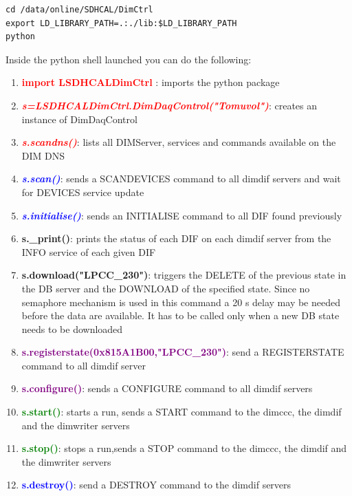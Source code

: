 \documentclass[english]{article}
\begin{document}
\begin{verbatim}
cd /data/online/SDHCAL/DimCtrl
export LD_LIBRARY_PATH=.:./lib:$LD_LIBRARY_PATH
python
\end{verbatim}  

Inside the python shell launched you can do the following:

\begin{enumerate} 
\item \textcolor{red}{ \bf  import LSDHCALDimCtrl} :  imports the python package

\item \textcolor{red}{\it \bf s=LSDHCALDimCtrl.DimDaqControl("Tomuvol")}:  creates an instance of DimDaqControl

\item \textcolor{red}{\it \bf s.scandns()}: lists all DIMServer, services and commands available on the DIM DNS  
\item \textcolor{blue}{\it \bf s.scan()}: sends a SCANDEVICES command to all dimdif servers and wait for DEVICES service update

\item \textcolor{blue}{\it {\bf s.initialise()}}: sends an INITIALISE command to all DIF found previously
\item {\bf s.\_print()}: prints the status of each DIF on each dimdif server from the INFO service of each given DIF
\item {\bf s.download("LPCC\_230")}: triggers the DELETE of the previous state in the DB server and the DOWNLOAD of the specified state. Since no semaphore mechanism is used in this command a 20 s delay may be needed before the data are available. It has to be called only when a new DB state needs to be downloaded

\item \textcolor{purple}{\bf s.registerstate(0x815A1B00,"LPCC\_230")}: send a REGISTERSTATE command to all dimdif server

\item \textcolor{purple}{\bf s.configure()}: sends a CONFIGURE command to all dimdif servers




\item \textcolor{green}{\bf s.start()}: starts a run, sends a START command to the dimccc, the dimdif and the dimwriter servers 

\item \textcolor{green}{\bf s.stop()}: stops a run,sends a STOP command to the dimccc, the dimdif and the dimwriter servers
\item \textcolor{blue}{\bf s.destroy()}: send a DESTROY command to the dimdif servers
\end{enumerate} 
\end{document}
